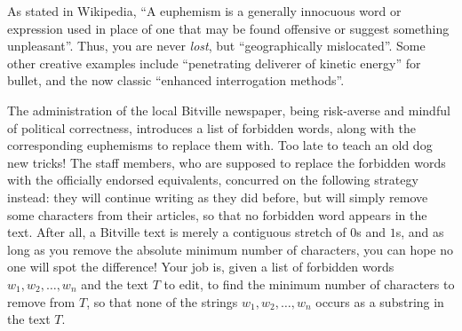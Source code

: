 
As stated in Wikipedia, ``A euphemism is a generally innocuous word or expression used in place of one that may be found offensive or suggest something unpleasant''.
Thus, you are never {\it{lost}}, but ``geographically mislocated''.
Some other creative examples include ``penetrating deliverer of kinetic energy'' for bullet, and the now classic ``enhanced interrogation methods''.

The administration of the local Bitville newspaper, being risk-averse and mindful of political correctness, introduces a list of forbidden words,
along with the corresponding euphemisms to replace them with. Too late to teach an old dog new tricks! The staff members, who are supposed to replace
the forbidden words with the officially endorsed equivalents, concurred on the following strategy instead: they will continue writing as they did before, 
but will simply remove some characters from their articles, so that no forbidden word appears in the text. After all, a Bitville text
is merely a contiguous stretch of $0$s and $1$s, and as long as you remove the absolute minimum number of characters, you can hope no one will spot the difference!
Your job is, given a list of forbidden words $w_1,w_2,\ldots,w_n$ and the text $T$ to edit, to find the minimum number of characters to remove from $T$,
so that none of the strings $w_1,w_2,\ldots,w_n$ occurs as a substring in the text $T.$ 

